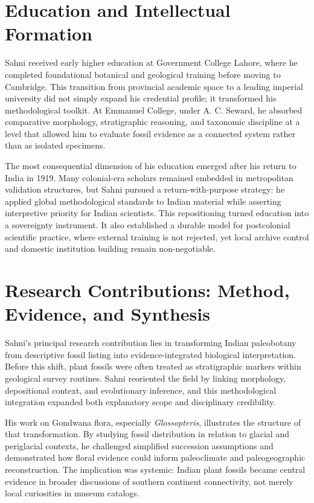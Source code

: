 \documentclass[10pt]{article}
\begin{document}
\section*{Education and Intellectual Formation}
Sahni received early higher education at Government College Lahore, where he completed foundational botanical and geological training before moving to Cambridge. This transition from provincial academic space to a leading imperial university did not simply expand his credential profile; it transformed his methodological toolkit. At Emmanuel College, under A. C. Seward, he absorbed comparative morphology, stratigraphic reasoning, and taxonomic discipline at a level that allowed him to evaluate fossil evidence as a connected system rather than as isolated specimens.\cite{tandf_memorial,ias_memorial,from_lahore_lucknow}

The most consequential dimension of his education emerged after his return to India in 1919. Many colonial-era scholars remained embedded in metropolitan validation structures, but Sahni pursued a return-with-purpose strategy: he applied global methodological standards to Indian material while asserting interpretive priority for Indian scientists. This repositioning turned education into a sovereignty instrument. It also established a durable model for postcolonial scientific practice, where external training is not rejected, yet local archive control and domestic institution building remain non-negotiable.\cite{science_state_nation,palaeobot_bio,from_lahore_lucknow}

\section*{Research Contributions: Method, Evidence, and Synthesis}
Sahni's principal research contribution lies in transforming Indian paleobotany from descriptive fossil listing into evidence-integrated biological interpretation. Before this shift, plant fossils were often treated as stratigraphic markers within geological survey routines. Sahni reoriented the field by linking morphology, depositional context, and evolutionary inference, and this methodological integration expanded both explanatory scope and disciplinary credibility.\cite{review_indian_paleobotany,recent_developments,palaeobot_bio}

His work on Gondwana flora, especially \textit{Glossopteris}, illustrates the structure of that transformation. By studying fossil distribution in relation to glacial and periglacial contexts, he challenged simplified succession assumptions and demonstrated how floral evidence could inform paleoclimate and paleogeographic reconstruction. The implication was systemic: Indian plant fossils became central evidence in broader discussions of southern continent connectivity, not merely local curiosities in museum catalogs.\cite{glossopteris_relation,regionalism_mobilism,from_lahore_lucknow}
\end{document}
